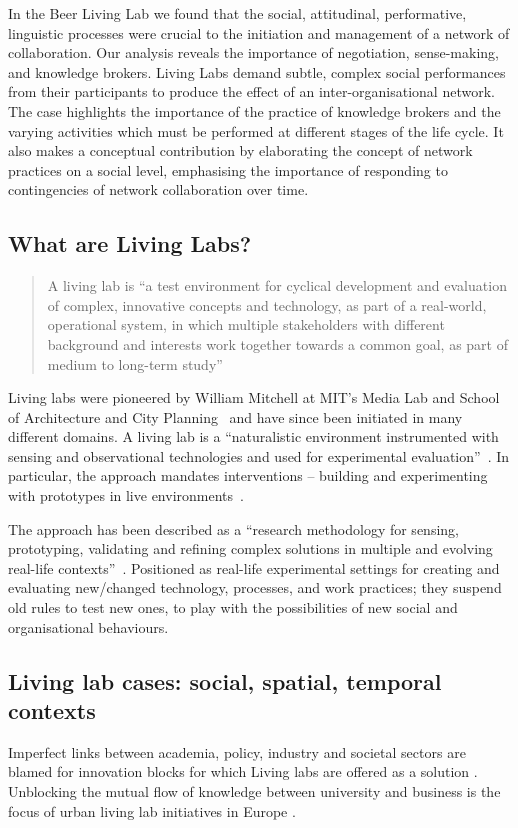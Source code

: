 \documentclass[graybox]{styles/svmult}
\begin{document}
In the Beer Living Lab we found that the social, attitudinal, performative, linguistic processes were crucial to the initiation and management of a network of collaboration. 
Our analysis reveals the importance of negotiation, sense-making, and knowledge brokers. Living Labs demand subtle, complex social performances from their participants to produce the effect of an inter-organisational network.
The case highlights the importance of the practice of knowledge brokers and the varying activities which must be performed at different stages of the life cycle. It also makes a conceptual contribution by elaborating the concept of network practices on a social level, emphasising the importance of responding to contingencies of network collaboration over time. 


\subsection{What are Living Labs?}
\blockquote{A living lab is \enquote{a test environment for cyclical development and evaluation of complex, innovative concepts and technology, as part of a real-world, operational system, in which multiple stakeholders with different background and interests work together towards a common goal, as part of medium to long-term study}~\citep{lucassen2014living} }
Living labs were pioneered by William Mitchell at MIT's Media Lab and School of Architecture and City Planning~\citep{eriksson2006living} and have since been initiated in many different domains.
A living lab is a \enquote{naturalistic environment instrumented with sensing and observational technologies and used for experimental evaluation}~\citep{IntLarab}.
In particular, the approach mandates interventions -- building and experimenting with prototypes in live environments~\citep{AboAtkaa}.

The approach has been described as a \enquote{research methodology for sensing, prototyping, validating and refining complex solutions in multiple and evolving real-life contexts}~\citep{pierson2005configuring}. 
Positioned as real-life experimental settings for creating and evaluating new/changed technology, processes, and work practices; they suspend old rules to test new ones, to play with the possibilities of new social and organisational behaviours. 



\subsection{Living lab cases: social, spatial, temporal contexts}
Imperfect links between academia, policy, industry and societal sectors are blamed for innovation blocks \citep{burbridge2017if} for which Living labs are offered as a solution \citep{canzler2017living}. 
Unblocking the mutual flow of knowledge between university and business is the focus of urban living lab initiatives in Europe \citep{grotenhuis2017living, voytenko2016urban}. 
\end{document}

